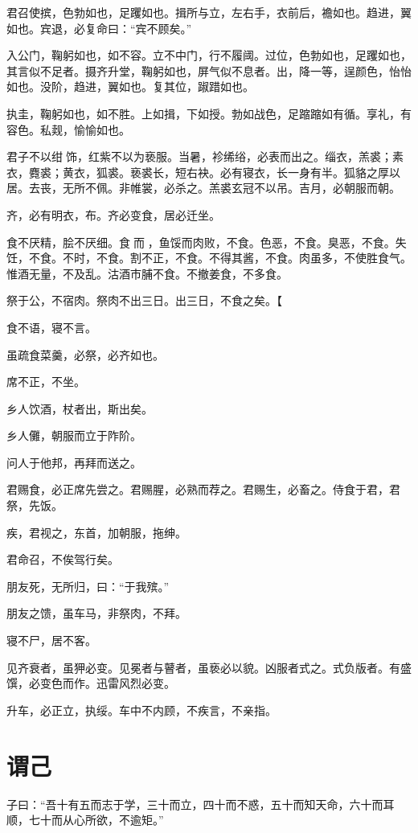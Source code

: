 \documentclass[a5paper]{ctexbook}
\begin{document}
    君召使摈，色勃如也，足躩如也。揖所与立，左右手，衣前后，襜如也。趋进，翼如也。宾退，必复命曰：“宾不顾矣。”

    入公门，鞠躬如也，如不容。立不中门，行不履阈。过位，色勃如也，足躩如也，其言似不足者。摄齐升堂，鞠躬如也，屏气似不息者。出，降一等，逞颜色，怡怡如也。没阶，趋进，翼如也。复其位，踧踖如也。

    执圭，鞠躬如也，如不胜。上如揖，下如授。勃如战色，足蹜蹜如有循。享礼，有容色。私觌，愉愉如也。

    君子不以绀𮉪饰，红紫不以为亵服。当暑，袗𫄨绤，必表而出之。缁衣，羔裘；素衣，麑裘；黄衣，狐裘。亵裘长，短右袂。必有寝衣，长一身有半。狐貉之厚以居。去丧，无所不佩。非帷裳，必杀之。羔裘玄冠不以吊。吉月，必朝服而朝。

    齐，必有明衣，布。齐必变食，居必迁坐。

    食不厌精，脍不厌细。食𮩞而𮩝，鱼馁而肉败，不食。色恶，不食。臭恶，不食。失饪，不食。不时，不食。割不正，不食。不得其酱，不食。肉虽多，不使胜食气。惟酒无量，不及乱。沽酒市脯不食。不撤姜食，不多食。

    祭于公，不宿肉。祭肉不出三日。出三日，不食之矣。【
    
    食不语，寝不言。
    
    虽疏食菜羹，必祭，必齐如也。

    席不正，不坐。
    
    乡人饮酒，杖者出，斯出矣。
    
    乡人儺，朝服而立于阼阶。
    
    问人于他邦，再拜而送之。

    君赐食，必正席先尝之。君赐腥，必熟而荐之。君赐生，必畜之。侍食于君，君祭，先饭。

    疾，君视之，东首，加朝服，拖绅。
    
    君命召，不俟驾行矣。

    朋友死，无所归，曰：“于我殡。”
    
    朋友之馈，虽车马，非祭肉，不拜。
    
    寝不尸，居不客。

    见齐衰者，虽狎必变。见冕者与瞽者，虽亵必以貌。凶服者式之。式负版者。有盛馔，必变色而作。迅雷风烈必变。

    升车，必正立，执绥。车中不内顾，不疾言，不亲指。

    \chapter{谓己}

    子曰：“吾十有五而志于学，三十而立，四十而不惑，五十而知天命，六十而耳顺，七十而从心所欲，不逾矩。”
\end{document}
